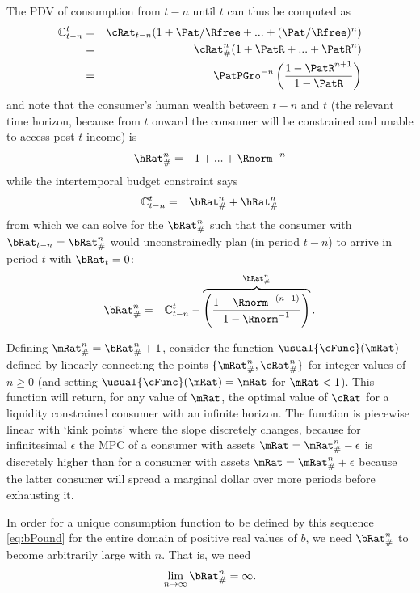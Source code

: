 \documentclass[./BufferStockTheory.tex]{subfiles}
\begin{document}
The PDV of consumption from $t-n$ until $t$ can thus be computed as
\begin{eqnarray}
   \mathbb{C}_{t-n}^{t} & = & \cRat_{t-n}(1+\Pat/\Rfree+ ... + (\Pat/\Rfree)^{n}) \notag
\\ & = & \cRat_{\#}^{n}(1+\PatR+ ... + \PatR^{n}) \notag
\\ & = & \PatPGro^{-n}\left(\frac{1-\PatR^{n+1}}{1-\PatR}\right) \label{PDVc}
\end{eqnarray}
and note that the consumer's human wealth between $t-n$ and $t$ (the relevant
time horizon, because from $t$ onward the consumer will be constrained
and unable to access post-$t$ income) is
\begin{eqnarray}
  \hRat_{\#}^{n} & = & 1+...+\Rnorm^{-n}
\end{eqnarray}
while the intertemporal budget constraint says
\begin{eqnarray*}
  \mathbb{C}_{t-n}^{t} & = & \bRat_{\#}^{n}+\hRat_{\#}^{n}
\end{eqnarray*}
from which we can solve for the $\bRat_{\#}^{n}$ such that
the consumer with $\bRat_{t-n} = \bRat_{\#}^{n}$ would
unconstrainedly plan (in period $t-n$) to arrive in period $t$ with
$\bRat_{t}=0$:
\begin{eqnarray}
\bRat_{\#}^{n} & =&  \mathbb{C}_{t-n}^{t} - \overbrace{\left(\frac{1-\Rnorm^{-(n+1)}}{1-\Rnorm^{-1}}\right)}^{\hRat_{\#}^{n}} \label{eq:bPound}.
\end{eqnarray}

Defining $\mRat_{\#}^{n}=\bRat_{\#}^{n}+1$, consider the function
$\usual{\cFunc}(\mRat)$ defined by linearly connecting the points
$\{\mRat_{\#}^{n},\cRat_{\#}^{n}\}$ for integer values of $n \geq 0$
(and setting $\usual{\cFunc}(\mRat)=\mRat$ for $\mRat<1$).  This
function will return, for any value of $\mRat$, the optimal value of
$\cRat$ for a liquidity constrained consumer with an infinite horizon.
The function is piecewise linear with `kink points' where the slope
discretely changes, because for infinitesimal $\epsilon$ the MPC of a
consumer with assets $\mRat=\mRat_{\#}^{n}-\epsilon$ is discretely
higher than for a consumer with assets $\mRat=\mRat_{\#}^{n}+\epsilon$
because the latter consumer will spread a marginal dollar over more
periods before exhausting it.

In order for a unique consumption function to be defined by this
sequence \eqref{eq:bPound} for the entire domain of positive real
values of $b$, we need $\bRat_{\#}^{n}$ to become arbitrarily large with
$n$.  That is, we need
\begin{eqnarray}
  \lim_{n \rightarrow \infty} \bRat_{\#}^{n} = \infty. \label{eq:bToInfty}
\end{eqnarray}
\end{document}
